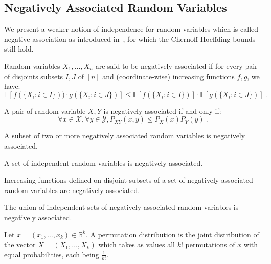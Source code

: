 \subsection{Negatively Associated Random Variables}
We present a weaker notion of independence for random variables which is called negative association as introduced in~\cite{JP83}, for which the Chernoff-Hoeffding bounds still hold.

\begin{definition}
   \label{defi:NA}
Random variables $X_1,\ldots,X_n$ are said to be negatively associated if for every pair of disjoints subsets $I,J$ of $[n]$ and (coordinate-wise) increasing functions $f,g$, we have:
    \[ \mathbb{E}[f(\{X_i : i \in I\})) \cdot g(\{X_i : i \in J\})] \leq  \mathbb{E}[f(\{X_i : i \in I\})] \cdot \mathbb{E}[g(\{X_i : i \in J\})] \ .\]
\end{definition}

\begin{proposition}
  \label{prop:NA_P1}
  A pair of random variable $X,Y$ is negatively associated if and only if:
  \[ \forall x \in \mathcal{X},  \forall y \in \mathcal{Y}, P_{XY}(x,y) \leq P_X(x)P_Y(y) \ .\]
\end{proposition}

\begin{proposition}
  \label{prop:NA_P4}
  A subset of two or more negatively associated random variables is negatively associated.
\end{proposition}

\begin{proposition}
  \label{prop:NA_P5}
  A set of independent random variables is negatively associated.
\end{proposition}

\begin{proposition}
  \label{prop:NA_P6}
  Increasing functions defined on disjoint subsets of a set of negatively associated random variables are negatively associated.
\end{proposition}

\begin{proposition}
    \label{prop:NA_P7}
    The union of independent sets of negatively associated random variables is negatively associated.
\end{proposition}

\begin{definition}
  \label{defi:perm}
  Let $x = (x_1,\ldots,x_k) \in \mathbb{R}^k$. A permutation distribution is the joint distribution of the vector $X = (X_1,\ldots,X_k)$ which takes as values all $k!$ permutations of $x$ with equal probabilities, each being $\frac{1}{k!}$.
\end{definition}

